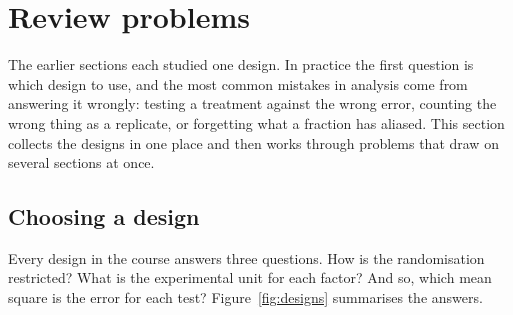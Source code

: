 \documentclass[11pt,a4paper]{article}
\numberwithin{equation}{section}
\theoremstyle{definition}
\begin{document}
\section{Review problems}\label{sec:review}
The earlier sections each studied one design. In practice the first question is which design to use, and the most common mistakes in analysis come
from answering it wrongly: testing a treatment against the wrong error, counting the wrong thing as a replicate, or forgetting what a fraction has
aliased. This section collects the designs in one place and then works through problems that draw on several sections at once.

\subsection{Choosing a design}
Every design in the course answers three questions. How is the randomisation restricted? What is the experimental unit for each factor? And so,
which mean square is the error for each test? Figure~\ref{fig:designs} summarises the answers.
\end{document}
